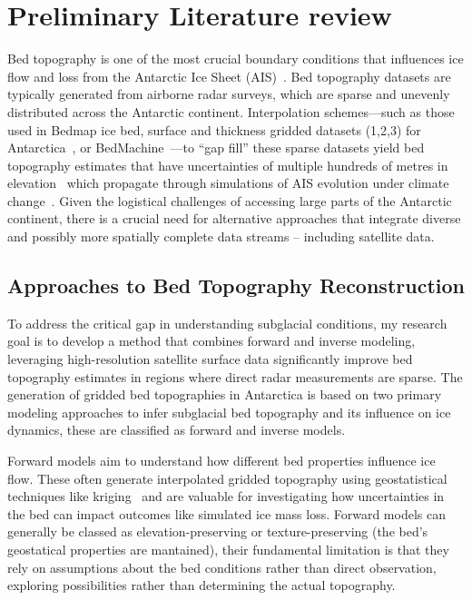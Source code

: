 \chapter{Preliminary Literature review}\label{review}
Bed topography is one of the most crucial boundary conditions that influences ice flow and loss from the Antarctic Ice Sheet (AIS)~\cite{Morlighem_2020}. Bed topography datasets are typically generated from airborne radar surveys, which are sparse and unevenly distributed across the Antarctic continent. Interpolation schemes—such as those used in Bedmap ice bed, surface and thickness gridded datasets (1,2,3) for Antarctica~\cite{Lythe_2001, Fretwell_2013, Pritchard_2025}, or BedMachine~\cite{Morlighem_2017}—to ``gap fill'' these sparse datasets yield bed topography estimates that have uncertainties of multiple hundreds of metres in elevation~\cite{Morlighem_2020} which propagate through simulations of AIS evolution under climate change~\cite{Castleman_2022}. Given the logistical challenges of accessing large parts of the Antarctic continent, there is a crucial need for alternative approaches that integrate diverse and possibly more spatially complete data streams – including satellite data.

\section{Approaches to Bed Topography Reconstruction}
To address the critical gap in understanding subglacial conditions, my research goal is to develop a method that combines forward and inverse modeling, leveraging high-resolution satellite surface data significantly improve bed topography estimates in regions where direct radar measurements are sparse.
The generation of gridded bed topographies in Antarctica is based on two primary modeling approaches to infer subglacial bed topography and its influence on ice dynamics, these are classified as forward and inverse models. 

Forward models aim to understand how different bed properties influence ice flow. These often generate interpolated gridded topography using geostatistical techniques like kriging~\cite{Mackie_2020} and are valuable for investigating how uncertainties in the bed can impact outcomes like simulated ice mass loss. Forward models can generally be classed as elevation-preserving or texture-preserving (the bed's geostatical properties are mantained), their fundamental limitation is that they rely on assumptions about the bed conditions rather than direct observation, exploring possibilities rather than determining the actual topography. 

